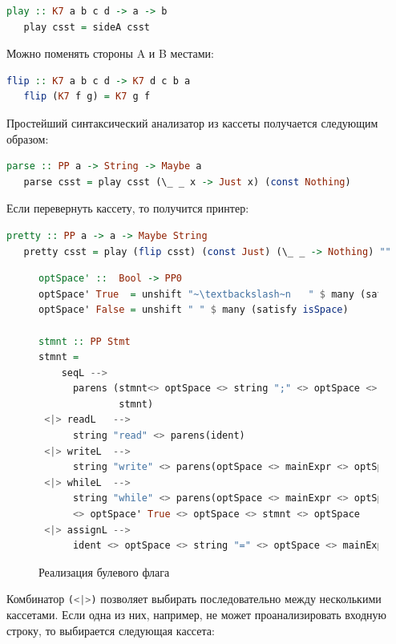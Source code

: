 \begin{lstlisting}[mathescape,language=Haskell]
   play :: K7 a b c d -> a -> b
   play csst = sideA csst
\end{lstlisting}

Можно поменять стороны A и B местами:

\begin{lstlisting}[mathescape,language=Haskell]
   flip :: K7 a b c d -> K7 d c b a
   flip (K7 f g) = K7 g f
\end{lstlisting}

Простейший синтаксический анализатор из кассеты получается следующим образом:

\begin{lstlisting}[mathescape,language=Haskell]
   parse :: PP a -> String -> Maybe a
   parse csst = play csst (\_ _ x -> Just x) (const Nothing)
\end{lstlisting}

Если перевернуть кассету, то получится принтер:

\begin{lstlisting}[mathescape,language=Haskell]
   pretty :: PP a -> a -> Maybe String
   pretty csst = play (flip csst) (const Just) (\_ _ -> Nothing) ""
\end{lstlisting}

\begin{figure}[ht]
\centering
\begin{lstlisting}[language=Haskell]
optSpace' ::  Bool -> PP0
optSpace' True  = unshift "~\textbackslash~n   " $ many (satisfy isSpace)
optSpace' False = unshift " " $ many (satisfy isSpace)

stmnt :: PP Stmt
stmnt = 
    seqL -->
      parens (stmnt<> optSpace <> string ";" <> optSpace <> 
              stmnt)
 <|> readL   -->
      string "read" <> parens(ident)
 <|> writeL  -->
      string "write" <> parens(optSpace <> mainExpr <> optSpace)
 <|> whileL  -->
      string "while" <> parens(optSpace <> mainExpr <> optSpace) 
      <> optSpace' True <> optSpace <> stmnt <> optSpace 
 <|> assignL --> 
      ident <> optSpace <> string "=" <> optSpace <> mainExpr  
\end{lstlisting}
\caption{Реализация булевого флага}
\label{boolFlag2}
\end{figure}

Комбинатор \lstinline[language=Haskell]{(<|>)} позволяет выбирать последовательно 
между несколькими кассетами. Если одна из них, например, не может проанализировать 
входную строку, то выбирается следующая кассета:

